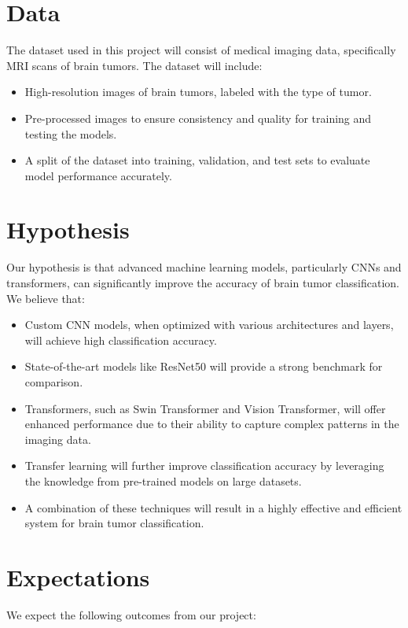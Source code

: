 \documentclass[conference]{IEEEtran}
\begin{document}
\section{Data}
The dataset used in this project will consist of medical imaging data, specifically MRI scans of brain tumors. The dataset will include:
\begin{itemize}
    \item High-resolution images of brain tumors, labeled with the type of tumor.
    \item Pre-processed images to ensure consistency and quality for training and testing the models.
    \item A split of the dataset into training, validation, and test sets to evaluate model performance accurately.
\end{itemize}

\section{Hypothesis}
Our hypothesis is that advanced machine learning models, particularly CNNs and transformers, can significantly improve the accuracy of brain tumor classification. We believe that:

\begin{itemize}
    \item Custom CNN models, when optimized with various architectures and layers, will achieve high classification accuracy.
    \item State-of-the-art models like ResNet50 will provide a strong benchmark for comparison.
    \item Transformers, such as Swin Transformer and Vision Transformer, will offer enhanced performance due to their ability to capture complex patterns in the imaging data.
    \item Transfer learning will further improve classification accuracy by leveraging the knowledge from pre-trained models on large datasets.
    \item A combination of these techniques will result in a highly effective and efficient system for brain tumor classification.
\end{itemize}

\section{Expectations}
We expect the following outcomes from our project:
\end{document}
